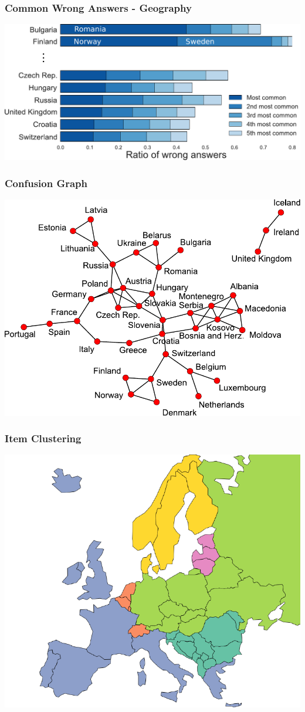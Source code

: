 \documentclass[xcolor=svgnames]{beamer}
\begin{document}
\begin{frame}
    \frametitle{Common Wrong Answers - Geography}
    \centering
    \includegraphics[width=\linewidth]{figures/wrong-answers-bar}
\end{frame}
\begin{frame}
    \frametitle{Confusion Graph}
    \centering
    \includegraphics[width=\linewidth]{figures/confusion-clustering-graph}
\end{frame}
\begin{frame}
    \frametitle{Item Clustering}
    \centering
    \includegraphics[width=0.7\linewidth]{figures/confusion-clustering-map}
\end{frame}
\end{document}
